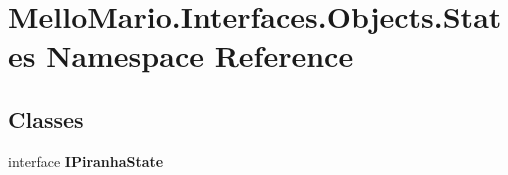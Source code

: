 \section{Mello\+Mario.\+Interfaces.\+Objects.\+States Namespace Reference}
\label{namespaceMelloMario_1_1Interfaces_1_1Objects_1_1States}
\subsection*{Classes}
\begin{DoxyCompactItemize}
\item 
interface \textbf{ I\+Piranha\+State}
\end{DoxyCompactItemize}
